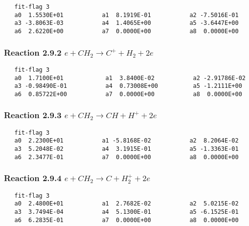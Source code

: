 \documentclass[12pt]{article}
\begin{document}
\begin{small}\begin{verbatim} 
   fit-flag 3
   a0  1.5530E+01           a1  8.1919E-01           a2 -7.5016E-01 
   a3 -3.8063E-03           a4  1.4065E+00           a5 -3.6447E+00 
   a6  2.6220E+00           a7  0.0000E+00           a8  0.0000E+00
\end{verbatim}\end{small}

\subsubsection{
Reaction 2.9.2   $e + CH_{2} \rightarrow C^{+} + H_{2} + 2e$
}

\begin{small}\begin{verbatim} 
   fit-flag 3
   a0  1.7100E+01            a1  3.8400E-02           a2 -2.91786E-02
   a3 -0.98490E-01           a4  0.73008E+00          a5 -1.2111E+00 
   a6  0.85722E+00           a7  0.0000E+00           a8  0.0000E+00
\end{verbatim}\end{small}

\subsubsection{
Reaction 2.9.3   $e + CH_{2} \rightarrow CH + H^{+} + 2e $
}

\begin{small}\begin{verbatim} 
   fit-flag 3
   a0  2.2300E+01           a1 -5.8168E-02           a2  8.2064E-02 
   a3  5.2048E-02           a4  3.1915E-01           a5 -1.3363E-01 
   a6  2.3477E-01           a7  0.0000E+00           a8  0.0000E+00
\end{verbatim}\end{small}

\subsubsection{
Reaction 2.9.4   $e + CH_{2} \rightarrow C + H_{2}^{+} + 2e$
}

\begin{small}\begin{verbatim} 
   fit-flag 3
   a0  2.4800E+01           a1  2.7682E-02           a2  5.0215E-02 
   a3  3.7494E-04           a4  5.1300E-01           a5 -6.1525E-01 
   a6  6.2835E-01           a7  0.0000E+00           a8  0.0000E+00
\end{verbatim}\end{small}
\end{document}
